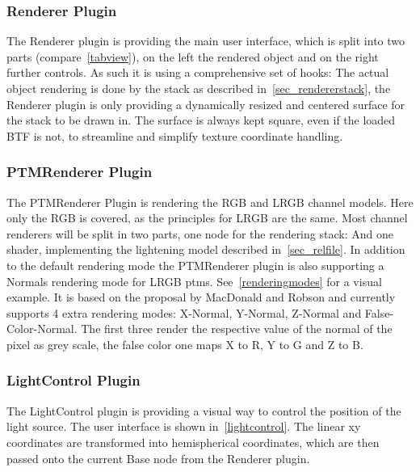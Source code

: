 \subsubsection{Renderer Plugin}
The Renderer plugin is providing the main user interface, which is split into
two parts (compare~\autoref{tabview}), on the left the rendered object and on
the right further controls. As such it is using a comprehensive set of hooks:
The actual object rendering is done by the stack as described
in~\autoref{sec_rendererstack}, the Renderer plugin is only providing a
dynamically resized and centered surface for the stack to be drawn in. The
surface is always kept square, even if the loaded BTF is not, to streamline and
simplify texture coordinate handling.

\subsubsection{PTMRenderer Plugin}\label{sec_ptmrender}
The PTMRenderer Plugin is rendering the RGB and LRGB channel
models. Here only the RGB is covered, as the principles for LRGB are the same.
Most channel renderers will be split in two parts, one node for the rendering
stack:
And one shader, implementing the lightening model described in~\autoref{sec_relfile}.
In addition to the default rendering mode the PTMRenderer plugin is also
supporting a Normals rendering mode for LRGB ptms. See~\autoref{renderingmodes}
for a visual example. It is based on the proposal by MacDonald and
Robson\cite*{macdonald_polynomial_2010} and currently supports 4 extra rendering
modes: X-Normal, Y-Normal, Z-Normal and False-Color-Normal. The first three
render the respective value of the normal of the pixel as grey scale, the false
color one maps X to R, Y to G and Z to B.

\subsubsection{LightControl Plugin}
The LightControl plugin is providing a visual way to control the position of the
light source. The user interface is shown in~\autoref{lightcontrol}. The
linear xy coordinates are transformed into hemispherical coordinates, which are
then passed onto the current Base node from the Renderer plugin.

